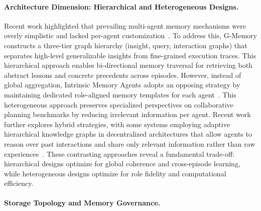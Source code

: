 
\paragraph{Architecture Dimension: Hierarchical and Heterogeneous Designs.}

Recent work highlighted that prevailing multi-agent memory mechanisms were overly simplistic and lacked per-agent customization~\cite{zhang2025gmemory}. To address this, G-Memory constructs a three-tier graph hierarchy (insight, query, interaction graphs) that separates high-level generalizable insights from fine-grained execution traces. This hierarchical approach enables bi-directional memory traversal for retrieving both abstract lessons and concrete precedents across episodes. However, instead of global aggregation, Intrinsic Memory Agents adopts an opposing strategy by maintaining dedicated role-aligned memory templates for each agent~\cite{yuen2025intrinsic}. This heterogeneous approach preserves specialized perspectives on collaborative planning benchmarks by reducing irrelevant information per agent. Recent work further explores hybrid strategies, with some systems employing adaptive hierarchical knowledge graphs in decentralized architectures that allow agents to reason over past interactions and share only relevant information rather than raw experiences~\cite{yang2025damcs}. These contrasting approaches reveal a fundamental trade-off: hierarchical designs optimize for global coherence and cross-episode learning, while heterogeneous designs optimize for role fidelity and computational efficiency.


\paragraph{Storage Topology and Memory Governance.}

